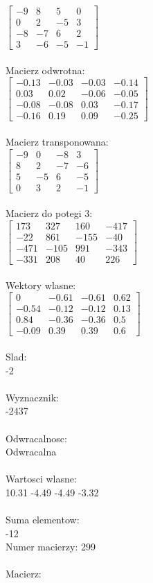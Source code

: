 \documentclass[a4paper,12pt]{article}
\begin{document}
$\begin{bmatrix} -9&8&5&0\\0&2&-5&3\\-8&-7&6&2\\3&-6&-5&-1 \end{bmatrix}$
\\
\\
Macierz odwrotna:\\

$\begin{bmatrix} -0.13&-0.03&-0.03&-0.14\\0.03&0.02&-0.06&-0.05\\-0.08&-0.08&0.03&-0.17\\-0.16&0.19&0.09&-0.25 \end{bmatrix}$
\\
\\
Macierz transponowana:\\

$\begin{bmatrix} -9&0&-8&3\\8&2&-7&-6\\5&-5&6&-5\\0&3&2&-1 \end{bmatrix}$
\\
\\
Macierz do potegi 3:\\

$\begin{bmatrix} 173&327&160&-417\\-22&861&-155&-40\\-471&-105&991&-343\\-331&208&40&226 \end{bmatrix}$
\\
\\
Wektory wlasne:\\

$\begin{bmatrix} 0&-0.61&-0.61&0.62\\-0.54&-0.12&-0.12&0.13\\0.84&-0.36&-0.36&0.5\\-0.09&0.39&0.39&0.6 \end{bmatrix}$
\\
\\
Slad:\\
-2
\\
\\
Wyznacznik:\\
-2437
\\
\\
Odwracalnosc:\\
Odwracalna
\\
\\
Wartosci wlasne:\\
10.31 -4.49 -4.49 -3.32
\\
\\
Suma elementow:\\
-12
\\
\newpage
Numer macierzy:
299
\\
\\
Macierz:\\
\end{document}
